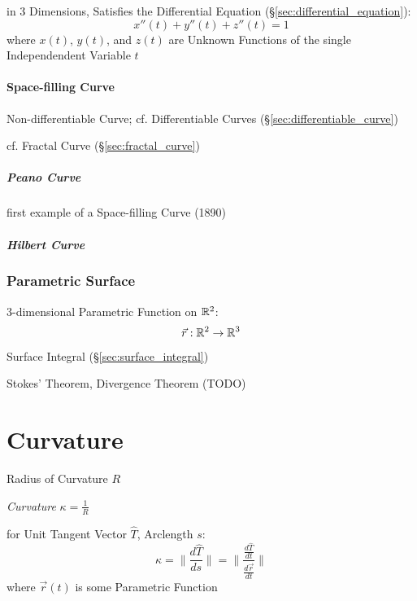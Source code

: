 in 3 Dimensions, Satisfies the Differential Equation
(\S\ref{sec:differential_equation}):
\[
  x''(t) + y''(t) + z''(t) = 1
\]
where $x(t)$, $y(t)$, and $z(t)$ are Unknown Functions of the single
Independendent Variable $t$



\paragraph{Space-filling Curve}\label{sec:space_filling_curve}\hfill

Non-differentiable Curve; cf. Differentiable Curves
(\S\ref{sec:differentiable_curve})

cf. Fractal Curve (\S\ref{sec:fractal_curve})



\subparagraph{Peano Curve}\label{sec:peano_curve}\hfill

first example of a Space-filling Curve (1890)



\subparagraph{Hilbert Curve}\label{sec:hilbert_curve}\hfill



\subsubsection{Parametric Surface}\label{sec:parametric_surface}

3-dimensional Parametric Function on
$\mathbb{R}^2$:
\[
  \vec{r} : \mathbb{R}^2 \rightarrow \mathbb{R}^3
\]

Surface Integral (\S\ref{sec:surface_integral})

Stokes' Theorem, Divergence Theorem (TODO)



\section{Curvature}\label{sec:curvature}

Radius of Curvature $R$

\emph{Curvature} $\kappa = \frac{1}{R}$

for Unit Tangent Vector $\hat{T}$, Arclength $s$:
\[
  \kappa = \|\frac{d\hat{T}}{ds}\|
    = \|\frac{\frac{d\hat{T}}{dt}}{\frac{d\vec{r}}{dt}}\|
\]
where $\vec{r}(t)$ is some Parametric Function

